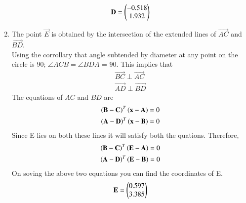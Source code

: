 \begin{enumerate}[label=\thesection.\arabic*.,ref=\thesection.\theenumi]
\begin{align}
\mathbf{D}= \begin{pmatrix}-0.518\\1.932\end{pmatrix}
\label{eq:constr_d}
\end{align}
\item The point $\vec{E}$ is obtained by the intersection of the extended lines of $\vec{AC}$ and $\vec{BD}$. \\
Using the corrollary that angle subtended by diameter at any point on the circle is 90\degree ; $\angle ACB = \angle BDA$ = 90\degree. This implies that \\
\begin{align} 
\vec{BC} \perp \vec{AC} \\
\vec{AD} \perp \vec{BD}
\end{align}
The equations of $AC$ and $BD$ are 
%
\begin{align}
\left(\mathbf{B}-\mathbf{C}\right)^T\left(\mathbf{x}-\mathbf{A}\right) &= 0  
\\
\left(\mathbf{A}-\mathbf{D}\right)^T\left(\mathbf{x}-\mathbf{B}\right) &= 0  
\end{align}
Since E lies on both these lines it will satisfy both the quations. Therefore,
\begin{align}
\left(\mathbf{B}-\mathbf{C}\right)^T\left(\mathbf{E}-\mathbf{A}\right) &= 0  
\\
\left(\mathbf{A}-\mathbf{D}\right)^T\left(\mathbf{E}-\mathbf{B}\right) &= 0  
\end{align}
On soving the above two equations you can find the coordinates of E.
\begin{align}
\mathbf{E}= \begin{pmatrix}0.597\\3.385\end{pmatrix}
\label{eq:constr_e}
\end{align}


\end{enumerate}
